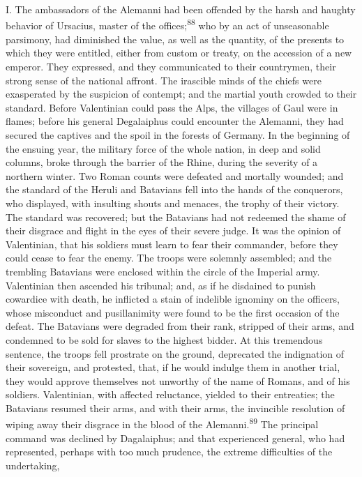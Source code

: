 {{{{{{{{{{{{{{{{{{{{{{{{{{{{{{{{{{{{{{{{{{{{{{{{{{{{{{{{{{{{{{{{{{{{{{{{{{{{{{{{{{{{{{{{{{{{{I. The ambassadors of the Alemanni had been offended by the harsh
and haughty behavior of Ursacius, master of the offices;\textsuperscript{88} who
by an act of unseasonable parsimony, had diminished the value, as
well as the quantity, of the presents to which they were
entitled, either from custom or treaty, on the accession of a new
emperor. They expressed, and they communicated to their
countrymen, their strong sense of the national affront. The
irascible minds of the chiefs were exasperated by the suspicion
of contempt; and the martial youth crowded to their standard.
Before Valentinian could pass the Alps, the villages of Gaul were
in flames; before his general Degalaiphus could encounter the
Alemanni, they had secured the captives and the spoil in the
forests of Germany. In the beginning of the ensuing year, the
military force of the whole nation, in deep and solid columns,
broke through the barrier of the Rhine, during the severity of a
northern winter. Two Roman counts were defeated and mortally
wounded; and the standard of the Heruli and Batavians fell into
the hands of the conquerors, who displayed, with insulting shouts
and menaces, the trophy of their victory. The standard was
recovered; but the Batavians had not redeemed the shame of their
disgrace and flight in the eyes of their severe judge. It was the
opinion of Valentinian, that his soldiers must learn to fear
their commander, before they could cease to fear the enemy. The
troops were solemnly assembled; and the trembling Batavians were
enclosed within the circle of the Imperial army. Valentinian then
ascended his tribunal; and, as if he disdained to punish
cowardice with death, he inflicted a stain of indelible ignominy
on the officers, whose misconduct and pusillanimity were found to
be the first occasion of the defeat. The Batavians were degraded
from their rank, stripped of their arms, and condemned to be sold
for slaves to the highest bidder. At this tremendous sentence,
the troops fell prostrate on the ground, deprecated the
indignation of their sovereign, and protested, that, if he would
indulge them in another trial, they would approve themselves not
unworthy of the name of Romans, and of his soldiers. Valentinian,
with affected reluctance, yielded to their entreaties; the
Batavians resumed their arms, and with their arms, the invincible
resolution of wiping away their disgrace in the blood of the
Alemanni.\textsuperscript{89} The principal command was declined by Dagalaiphus;
and that experienced general, who had represented, perhaps with
too much prudence, the extreme difficulties of the undertaking,
}}}}}}}}}}}}}}}}}}}}}}}}}}}}}}}}}}}}}}}}}}}}}}}}}}}}}}}}}}}}}}}}}}}}}}}}}}}}}}}}}}}}}}}}}}}}}
